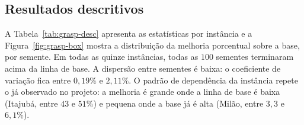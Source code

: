 \documentclass[11pt,a4paper]{article}
\begin{document}
\subsection{Resultados descritivos}

A Tabela~\ref{tab:grasp-desc} apresenta as estatísticas por instância e a Figura~\ref{fig:grasp-box} mostra a distribuição da melhoria porcentual sobre a base, por semente. Em todas as quinze instâncias, todas as $100$ sementes terminaram acima da linha de base. A dispersão entre sementes é baixa: o coeficiente de variação fica entre $0{,}19\%$ e $2{,}11\%$. O padrão de dependência da instância repete o já observado no projeto: a melhoria é grande onde a linha de base é baixa (Itajubá, entre $43$ e $51\%$) e pequena onde a base já é alta (Milão, entre $3{,}3$ e $6{,}1\%$).

\renewcommand{\arraystretch}{1.15}
\end{document}
